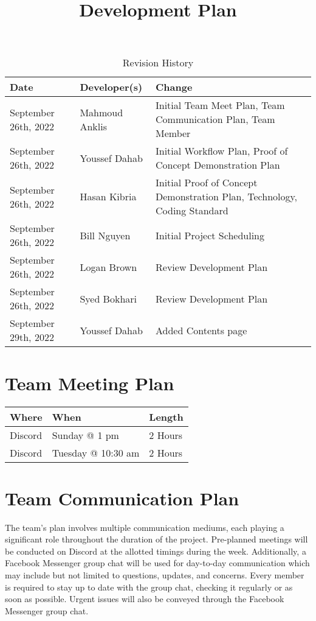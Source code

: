 \documentclass[12pt,letterpaper]{article}
\title{Development Plan\\\progname}
\author{\authname}
\date{}
\begin{document}
\maketitle

\begin{table}[hp]
	\caption{Revision History} \label{TblRevisionHistory}
	\begin{tabularx}{\textwidth}{llX}
		\toprule
		\textbf{Date} & \textbf{Developer(s)} & \textbf{Change}\\
		\midrule
		September 26th, 2022 & Mahmoud Anklis  & Initial Team Meet Plan, Team Communication Plan, Team Member\\
		September 26th, 2022 & Youssef Dahab  & Initial Workflow Plan, Proof of Concept Demonstration Plan \\
		September 26th, 2022 & Hasan Kibria  & Initial Proof of Concept Demonstration Plan, Technology, Coding Standard \\
		September 26th, 2022 & Bill Nguyen  & Initial Project Scheduling \\
		September 26th, 2022 & Logan Brown & Review Development Plan\\
		September 26th, 2022 & Syed Bokhari & Review Development Plan\\
		September 29th, 2022 & Youssef Dahab & Added Contents page\\
		\bottomrule
	\end{tabularx}
\end{table}

\newpage
\tableofcontents
\newpage

\section{Team Meeting Plan}
\begin{table}[hp]
	\begin{tabularx}{\textwidth}{|l|l|X|}
		\toprule
		\textbf{Where} & \textbf{When} & \textbf{Length}\\
		\midrule
		Discord & Sunday @ 1 pm & 2 Hours\\
		Discord & Tuesday @ 10:30 am & 2 Hours\\
		\bottomrule
	\end{tabularx}
\end{table}

\section{Team Communication Plan}
The team’s plan involves multiple communication mediums, each playing a significant role throughout the duration of the project. Pre-planned meetings will be conducted on Discord at the allotted timings during the week. Additionally, a Facebook Messenger group chat will be used for day-to-day communication which may include but not limited to questions, updates, and concerns. Every member is required to stay up to date with the group chat, checking it regularly or as soon as possible. Urgent issues will also be conveyed through the Facebook Messenger group chat. 
\end{document}
